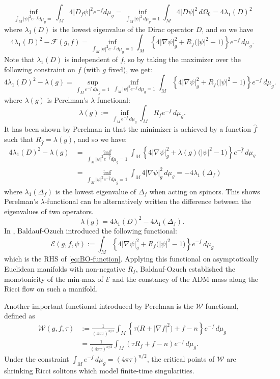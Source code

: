 \documentclass{amsart}
\theoremstyle{definition}
\theoremstyle{remark}
\numberwithin{equation}{section}
\newcommand{\abs}[1]{\left|#1\right|}
\begin{document}
\[\inf_{\int_M \abs{\psi}^2 e^{-f}d\mu_g = }\int_M 4\abs{D_f\psi}^2 e^{-f}d\mu_g = \inf_{\int_M\abs{\psi}^2\,d\mu_g = 1}\int_M 4\abs{D\psi}^2\,d\Omega_0 = 4\lambda_1(D)^2\]
where $\lambda_1(D)$ is the lowest eigenvalue of the Dirac operator $D$, and so we have
\[4\lambda_1(D)^2 - \mathcal{F}(g,f) = \inf_{\int_M \abs{\psi}^2 e^{-f}\,d\mu_g = 1}\int_M \left\{4\abs{\nabla\psi}_g^2 + R_f\big(\abs{\psi}^2 - 1\big) \right\}e^{-f}\,d\mu_g.\]
Note that $\lambda_1(D)$ is independent of $f$, so by taking the maximizer over the following constraint on $f$ (with $g$ fixed), we get:
\[4\lambda_1(D)^2 - \lambda(g) = \sup_{\int_M e^{-f}\,d\mu_g = 1}\inf_{\int_M \abs{\psi}^2 e^{-f}\,d\mu_g = 1}\int_M \left\{4\abs{\nabla\psi}_g^2 + R_f\big(\abs{\psi}^2 - 1\big) \right\}e^{-f}\,d\mu_g. \]
where $\lambda(g)$ is Perelman's $\lambda$-functional:
\[\lambda(g) := \inf_{\int_M e^{-f}\,d\mu_g} \int_M R_f e^{-f}\,d\mu_g.\]
It has been shown by Perelman in \cite{Perelman} that the minimizer is achieved by a function $\hat{f}$ such that $R_{\hat{f}} = \lambda(g)$, and so we have:
\begin{align*}
4\lambda_1(D)^2 - \lambda(g) & = \inf_{\int_M\abs{\psi}^2 e^{-\hat{f}}d\mu_g = 1} \int_M \left\{4\abs{\nabla\psi}^2_g + \lambda(g) \big(\abs{\psi}^2-1\big)\right\} e^{-\hat{f}}\,d\mu_g\\
&  = \inf_{\int_M\abs{\psi}^2 e^{-\hat{f}}d\mu_g = 1}\int_M 4\abs{\nabla\psi}_g^2\,d\mu_g = -4\lambda_1(\Delta_f)
\end{align*}
where $\lambda_1(\Delta_f)$ is the lowest eigenvalue of $\Delta_f$ when acting on spinors.
This shows Perelman's $\lambda$-functional can be alternatively written the difference between the eigenvalues of two operators.
\[\lambda(g) = 4\lambda_1(D)^2 - 4\lambda_1(\Delta_f).\]
In \cite{BO23}, Baldauf-Ozuch introduced the following functional:
\[\mathcal{E}(g,f,\psi) := \int_M \left\{4\abs{\nabla\psi}_g^2 + R_f\big(\abs{\psi}^2 - 1\big) \right\}e^{-f}\,d\mu_g\]
which is the RHS of \eqref{eq:BO-function}. Applying this functional on asymptotically Euclidean manifolds with non-negative $R_f$, Baldauf-Ozuch established the monotonicity of the min-max of $\mathcal{E}$ and the constancy of the ADM mass along the Ricci flow on such a manifold.

Another important functional introduced by Perelman is the $\mathcal{W}$-functional, defined as
\begin{align*}
\mathcal{W}(g,f,\tau) & := \frac{1}{(4\pi\tau)^{n/2}}\int_M \left\{\tau \big(R+\abs{\nabla f}^2\big) + f - n\right\}e^{-f}\,d\mu_g\\
& = \frac{1}{(4\pi\tau)^{n/2}}\int_M (\tau R_f + f - n)e^{-f}\,d\mu_g.
\end{align*}
Under the constraint $\int_M e^{-f}\,d\mu_g = (4\pi\tau)^{n/2}$, the critical points of $\mathcal{W}$ are shrinking Ricci solitons which model finite-time singularities.
\end{document}
